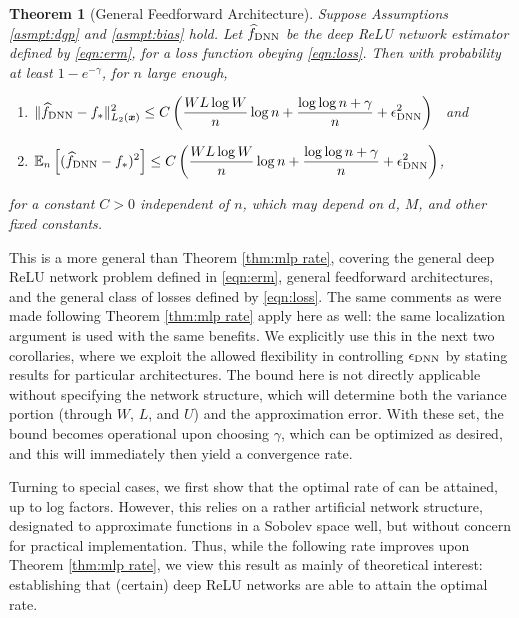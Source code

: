 \documentclass[11pt]{article}
\newtheorem{theorem}{Theorem}
\numberwithin{equation}{section}
\theoremstyle{definition}
\newcommand{\E}{\mathbb{E}}
\newcommand{\bx}{\bm{x}}
\begin{document}
\begin{theorem}[General Feedforward Architecture]
	\label{thm:generic rates}
	Suppose Assumptions \ref{asmpt:dgp} and \ref{asmpt:bias} hold. Let $\widehat{f}_{\rm DNN}$ be the deep ReLU network estimator defined by \eqref{eqn:erm}, for a loss function obeying \eqref{eqn:loss}. Then with probability at least $1 - e^{-\gamma}$, for $n$ large enough,
	\begin{enumerate}
		\item $\displaystyle \| \widehat{f}_{\rm DNN} - f_* \|_{L_2(\bx)}^2  \leq  C \left(  \frac{W L \log W}{n}\log n + \frac{\log \log n + \gamma}{n} + \epsilon_{\rm DNN}^2  \right)$ \ and 
		\item $\displaystyle\E_n \left[ ( \widehat{f}_{\rm DNN} - f_* )^2 \right] \leq C \left(  \frac{W L \log W}{n}\log n + \frac{\log \log n + \gamma}{n} + \epsilon_{\rm DNN}^2  \right) $,
	\end{enumerate}
	for a constant $C>0$ independent of $n$, which may depend on $d$, $M$, and other fixed constants.
\end{theorem}


This is a more general than Theorem \ref{thm:mlp rate}, covering the general deep ReLU network problem defined in \eqref{eqn:erm}, general feedforward architectures, and the general class of losses defined by \eqref{eqn:loss}. The same comments as were made following Theorem \ref{thm:mlp rate} apply here as well: the same localization argument is used with the same benefits. We explicitly use this in the next two corollaries, where we exploit the allowed flexibility in controlling $\epsilon_{\rm DNN}$ by stating results for particular architectures. The bound here is not directly applicable without specifying the network structure, which will determine both the variance portion (through $W$, $L$, and $U$) and the approximation error. With these set, the bound becomes operational upon choosing $\gamma$, which can be optimized as desired, and this will immediately then yield a convergence rate. 

Turning to special cases, we first show that the optimal rate of \cite{stone1982optimal} can be attained, up to log factors. However, this relies on a rather artificial network structure, designated to approximate functions in a Sobolev space well, but without concern for practical implementation. Thus, while the following rate improves upon Theorem \ref{thm:mlp rate}, we view this result as mainly of theoretical interest: establishing that (certain) deep ReLU networks are able to attain the optimal rate. 
\end{document}
